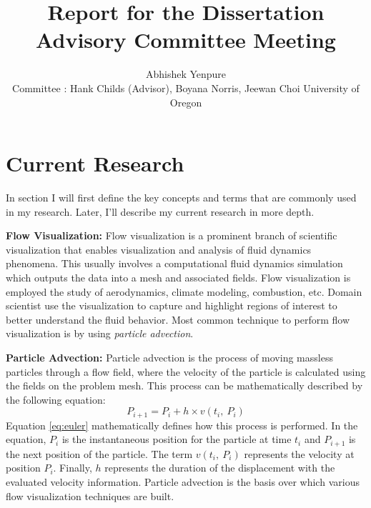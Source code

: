\documentclass[12pt,letter]{article}
\begin{document}
\title{Report for the Dissertation Advisory Committee Meeting}
\author{\parbox{\linewidth}{\centering
	Abhishek Yenpure\\
  Committee : Hank Childs (Advisor), Boyana Norris, Jeewan Choi
	University of Oregon}}
\maketitle
\parskip 0.0625in

\section{Current Research}
In section I will first define the key concepts and terms that are commonly used
in my research. Later, I'll describe my current research in more depth.

\noindent \textbf{Flow Visualization:}
Flow visualization is a prominent branch of scientific visualization that enables
visualization and analysis of fluid dynamics phenomena.
%
This usually involves a computational fluid dynamics simulation which outputs the
data into a mesh and associated fields.
%
Flow visualization is employed the study of aerodynamics, climate modeling, combustion, etc.
%
Domain scientist use the visualization to capture and highlight regions of interest to
better understand the fluid behavior.
%
Most common technique to perform flow visualization is by using \textit{particle advection}.

\noindent \textbf{Particle Advection:}
%
Particle advection is the process of moving massless particles through a flow field,
where the velocity of the particle is calculated using the fields on the problem mesh.
%
This process can be mathematically described by the following equation:
\begin{equation}
\label{eq:euler}
P_{i+1} = P_{i} + h \times v(t_{i},\ P_{i})
\end{equation}
%
Equation \ref{eq:euler} mathematically defines how this process is performed.
%
In the equation, $P_{i}$ is the instantaneous position for the particle at time $t_{i}$
and $P_{i+1}$ is the next position of the particle.
%
The term $v(t_{i},\ P_{i})$ represents the velocity at position $P_{i}$.
%
Finally, $h$ represents the duration of the displacement with the evaluated velocity information.
%
Particle advection is the basis over which various flow visualization techniques are built.
\end{document}
